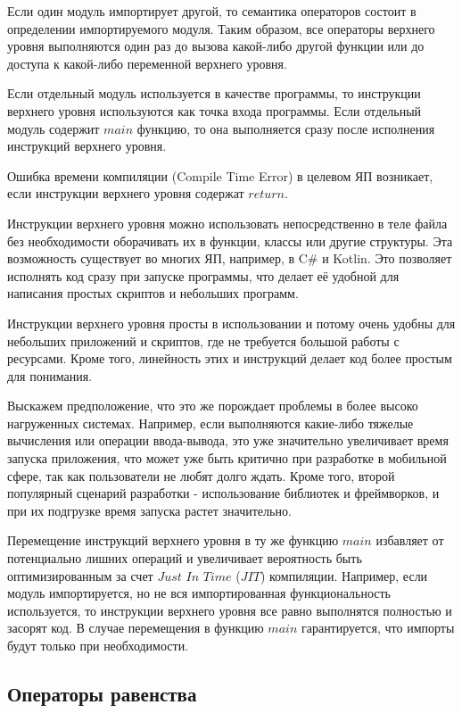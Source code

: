 \documentclass{mipt-thesis-bs}
\begin{document}
Если один модуль импортирует другой, то семантика операторов
состоит в определении импортируемого модуля.
Таким образом, все операторы верхнего уровня выполняются один раз до
вызова какой-либо другой функции или до доступа к какой-либо
переменной верхнего уровня.

Если отдельный модуль используется в качестве программы, то инструкции
верхнего уровня используются как точка входа программы. Если отдельный
модуль содержит $main$ функцию, то она выполняется сразу после
исполнения инструкций верхнего уровня.

Ошибка времени компиляции (Compile Time Error) в целевом ЯП возникает, если
инструкции верхнего уровня содержат $return$.

Инструкции верхнего уровня можно использовать
непосредственно в теле файла без необходимости оборачивать их в функции,
классы или другие структуры. Эта возможность существует во многих ЯП, например,
в C\# и Kotlin. Это позволяет исполнять код сразу при запуске программы, что делает её
удобной для написания простых скриптов и небольших программ.

Инструкции верхнего уровня просты в использовании и потому очень удобны
для небольших приложений и скриптов, где не требуется большой работы
с ресурсами. Кроме того, линейность этих и инструкций делает код
более простым для понимания.

Выскажем предположение, что это же порождает проблемы в более
высоко нагруженных системах. Например, если выполняются какие-либо
тяжелые вычисления или операции ввода-вывода, это уже значительно
увеличивает время запуска приложения, что может уже быть критично
при разработке в мобильной сфере, так как пользователи не любят
долго ждать. Кроме того, второй популярный сценарий разработки -
использование библиотек и фреймворков, и при их подгрузке время
запуска растет значительно.

Перемещение инструкций верхнего уровня
в ту же функцию $main$ избавляет от потенциально лишних операций
и увеличивает вероятность быть оптимизированным за счет $Just$ $In$ $Time$
($JIT$) компиляции.
Например, если модуль импортируется, но не вся импортированная
функциональность используется, то инструкции верхнего уровня все
равно выполнятся полностью и засорят код. В случае перемещения в
функцию $main$ гарантируется, что импорты будут  только
при необходимости.

\subsection{Операторы равенства}
\end{document}
